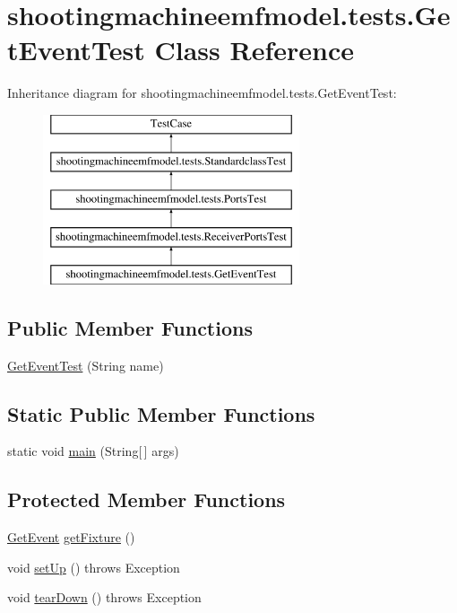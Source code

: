 \hypertarget{classshootingmachineemfmodel_1_1tests_1_1_get_event_test}{\section{shootingmachineemfmodel.\-tests.\-Get\-Event\-Test Class Reference}
\label{classshootingmachineemfmodel_1_1tests_1_1_get_event_test}
}
Inheritance diagram for shootingmachineemfmodel.\-tests.\-Get\-Event\-Test\-:\begin{figure}[H]
\begin{center}
\leavevmode
\includegraphics[height=5.000000cm]{classshootingmachineemfmodel_1_1tests_1_1_get_event_test}
\end{center}
\end{figure}
\subsection*{Public Member Functions}
\begin{DoxyCompactItemize}
\item 
\hyperlink{classshootingmachineemfmodel_1_1tests_1_1_get_event_test_a702b41799e93e79bc1b3d84e7532e40c}{Get\-Event\-Test} (String name)
\end{DoxyCompactItemize}
\subsection*{Static Public Member Functions}
\begin{DoxyCompactItemize}
\item 
static void \hyperlink{classshootingmachineemfmodel_1_1tests_1_1_get_event_test_ab9475b9811d7430a8dca0c7c9f3fb8f9}{main} (String\mbox{[}$\,$\mbox{]} args)
\end{DoxyCompactItemize}
\subsection*{Protected Member Functions}
\begin{DoxyCompactItemize}
\item 
\hyperlink{interfaceshootingmachineemfmodel_1_1_get_event}{Get\-Event} \hyperlink{classshootingmachineemfmodel_1_1tests_1_1_get_event_test_a8d54581080e30d511b011fac48914573}{get\-Fixture} ()
\item 
void \hyperlink{classshootingmachineemfmodel_1_1tests_1_1_get_event_test_affc294a2f2871f0e1568cd9fab1fd32e}{set\-Up} ()  throws Exception 
\item 
void \hyperlink{classshootingmachineemfmodel_1_1tests_1_1_get_event_test_a7045472c02eec414dcedcda24742bc23}{tear\-Down} ()  throws Exception 
\end{DoxyCompactItemize}
